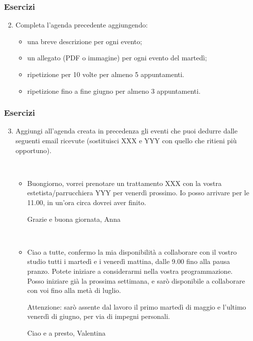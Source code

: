 \documentclass[handout]{beamer}
\begin{document}
\begin{frame}
  \frametitle{Esercizi}
  \begin{enumerate}\setcounter{enumi}{1}
    \item Completa l'agenda precedente aggiungendo:
    \begin{itemize}
      \item una breve descrizione per ogni evento;
      \item un allegato (PDF o immagine) per ogni evento del martedì;
      \item ripetizione per 10 volte per almeno 5 appuntamenti.
      \item ripetizione fino a fine giugno per almeno 3 appuntamenti.
    \end{itemize}
  \end{enumerate}
\end{frame}

\begin{frame}
  \frametitle{Esercizi}
  \begin{enumerate}\setcounter{enumi}{2}
    \item Aggiungi all'agenda creata in precedenza gli eventi che puoi dedurre dalle seguenti email ricevute (sostituisci XXX e YYY con quello che ritieni più opportuno).
    
    ~

    \begin{itemize}
      \item Buongiorno, vorrei prenotare un trattamento XXX con la vostra estetista/parrucchiera YYY per venerdì prossimo. Io posso arrivare per le 11.00, in un'ora circa dovrei aver finito.

      Grazie e buona giornata, Anna

      ~
      \item Ciao a tutte, confermo la mia disponibilità a collaborare con il vostro studio tutti i martedì e i venerdì mattina, dalle 9.00 fino alla pausa pranzo. Potete iniziare a considerarmi nella vostra programmazione. Posso iniziare già la prossima settimana, e sarò disponibile a collaborare con voi fino alla metà di luglio.

      Attenzione: sarò assente dal lavoro il primo martedì di maggio e l'ultimo venerdì di giugno, per via di impegni personali.

      Ciao e a presto, Valentina
    \end{itemize}
  \end{enumerate}
\end{frame}
\end{document}

